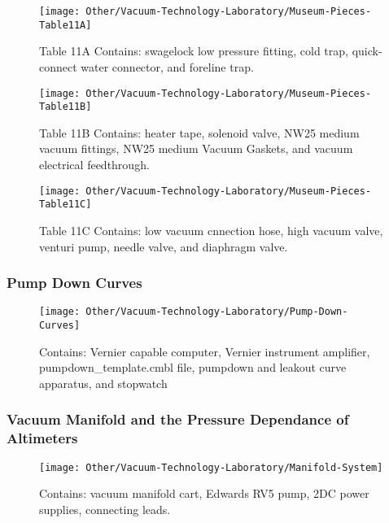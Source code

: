 \documentclass{book}
\begin{document}
\begin{figure}[H]
\texttt{[image: Other/Vacuum-Technology-Laboratory/Museum-Pieces-Table11A]}
\caption[align=left]{Table 11A Contains: swagelock low pressure fitting, cold trap, quick-connect water connector, and foreline trap.}
\end{figure}

\begin{figure}[H]
\texttt{[image: Other/Vacuum-Technology-Laboratory/Museum-Pieces-Table11B]}
\caption[align=left]{Table 11B Contains: heater tape, solenoid valve, NW25 medium vacuum fittings, NW25 medium Vacuum Gaskets, and vacuum electrical feedthrough.}
\end{figure}

\begin{figure}[H]
\texttt{[image: Other/Vacuum-Technology-Laboratory/Museum-Pieces-Table11C]}
\caption[align=left]{Table 11C Contains: low vacuum cnnection hose, high vacuum valve, venturi pump, needle valve, and diaphragm valve.}
\end{figure}

\subsubsection{Pump Down Curves}

\begin{figure}[H]
\texttt{[image: Other/Vacuum-Technology-Laboratory/Pump-Down-Curves]}
\caption[align=left]{Contains: Vernier capable computer, Vernier instrument amplifier, pumpdown_template.cmbl file, pumpdown and leakout curve apparatus, and stopwatch}
\end{figure}

\subsubsection{Vacuum Manifold and the Pressure Dependance of Altimeters}

\begin{figure}[H]
\texttt{[image: Other/Vacuum-Technology-Laboratory/Manifold-System]}
\caption[align=left]{Contains: vacuum manifold cart, Edwards RV5 pump, 2DC power supplies, connecting leads.}
\end{figure}

\newpage
\end{document}
